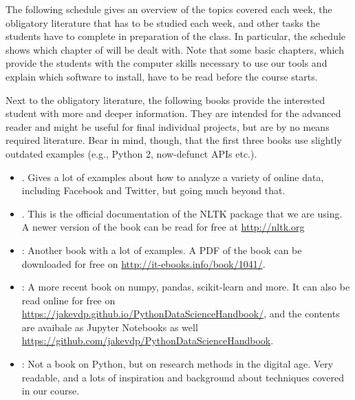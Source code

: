 
The following schedule gives an overview of the topics covered each week, the obligatory literature that has to be studied each week, and other tasks the students have to complete in preparation of the class.
In particular, the schedule shows which chapter of \cite{Trilling2016} will be dealt with. Note that some basic chapters, which provide the students with the computer skills necessary to use our tools and explain which software to install, have to be read before the course starts.

Next to the obligatory literature, the following books provide the interested student with more and deeper information. They are intended for the advanced reader and might be useful for final individual projects, but are by no means required literature. Bear in mind, though, that the first three books use slightly outdated examples (e.g., Python 2, now-defunct APIs etc.).

\begin{itemize}
\item \citealp{Russel2013}. Gives a lot of examples about how to analyze a variety of online data, including Facebook and Twitter, but going much beyond that.
\item \citealp{Bird2009}. This is the official documentation of the NLTK package that we are using. A newer version of the book can be read for free at \url{http://nltk.org}
\item \citealp{McKinney2012}: Another book with a lot of examples. A PDF of the book can be downloaded for free on \url{http://it-ebooks.info/book/1041/}.
\item \citealp{VanderPlas2016}: A more recent book on numpy, pandas, scikit-learn and more. It can also be read online for free on \url{https://jakevdp.github.io/PythonDataScienceHandbook/}, and the contents are avaibale as Jupyter Notebooks as well \url{https://github.com/jakevdp/PythonDataScienceHandbook}.
\item \citealp{Salganik2017}: Not a book on Python, but on research methods in the digital age. Very readable, and a lots of inspiration and background about techniques covered in our course.
\end{itemize}

